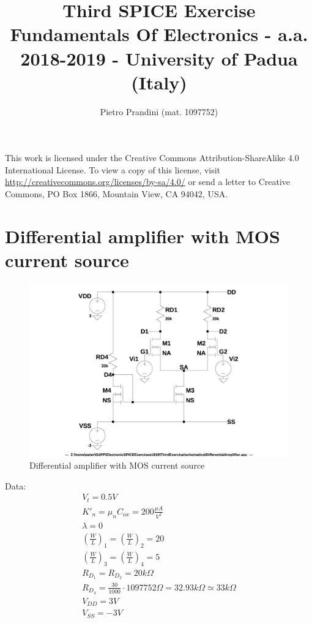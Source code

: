 \documentclass[10pt,a4paper]{book}
\title{Third SPICE Exercise\\{\small{Fundamentals Of Electronics - a.a. 2018-2019 -
University of Padua (Italy)}}}
\author{Pietro Prandini (mat. 1097752)}
\begin{document}
\maketitle

\vspace*{\fill}
\begin{center}
\tiny{This work is licensed under the Creative Commons Attribution-ShareAlike 4.0 International License. To view a copy of this license, visit \href{http://creativecommons.org/licenses/by-sa/4.0/}{http://creativecommons.org/licenses/by-sa/4.0/} or send a letter to Creative Commons, PO Box 1866, Mountain View, CA 94042, USA.}
\end{center}

\tableofcontents

\chapter{Differential amplifier with MOS current source}

\begin{figure}[h]
  \centering
  \includegraphics[width=12cm]{schematics/DifferentialAmplifier.jpg}
  \caption{Differential amplifier with MOS current source}
  \label{DifferentialAmplifier}
\end{figure}

Data:\\
\begin{align}
V_t = 0.5V\\
{K'}_n = {\mu}_n C_{ox} = 200 \frac{\mu A}{V^2}\\
\lambda = 0\\
\left(\frac{W}{L}\right)_1 = \left(\frac{W}{L}\right)_2 = 20\\
\left(\frac{W}{L}\right)_3 = \left(\frac{W}{L}\right)_4 = 5\\
R_{D_1} = R_{D_2} = 20k\Omega\\
R_{D_4} = \frac{30}{1000}\cdot 1097752 \Omega = 32.93k\Omega \simeq 33k\Omega\\
V_{DD} = 3V\\
V_{SS} = -3V
\end{align}
\end{document}
